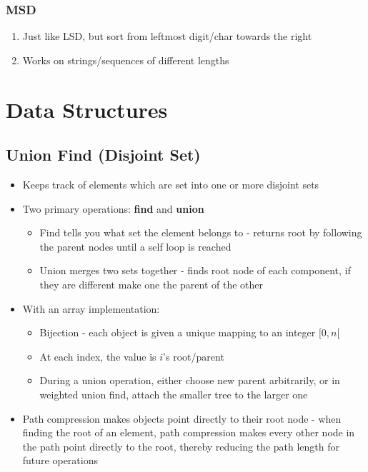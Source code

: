 \documentclass{article}
\begin{document}
\subsubsection{MSD}

\begin{enumerate}
    \item Just like LSD, but sort from leftmost digit/char towards the right
    \item Works on strings/sequences of different lengths
\end{enumerate}

\section{Data Structures}

\subsection{Union Find (Disjoint Set)}

\begin{itemize}
    \item Keeps track of elements which are set into one or more disjoint sets
    \item Two primary operations: \textbf{find} and \textbf{union}
    \begin{itemize}
        \item Find tells you what set the element belongs to - returns root by following the parent nodes until a self loop is reached
        \item Union merges two sets together - finds root node of each component, if they are different make one the parent of the other
    \end{itemize}
    \item With an array implementation:
    \begin{itemize}
        \item Bijection - each object is given a unique mapping to an integer $[0,n[$
        \item At each index, the value is $i$'s root/parent
        \item During a union operation, either choose new parent arbitrarily, or in weighted union find, attach the smaller tree to the larger one
    \end{itemize}
    \item Path compression makes objects point directly to their root node - when finding the root of an element, path compression makes every other node in the path point directly to the root, thereby reducing the path length for future operations
\end{itemize}
\end{document}
